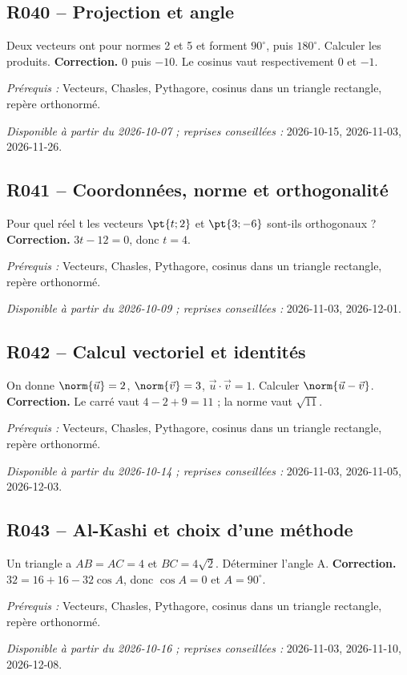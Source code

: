 \subsection*{R040 -- Projection et angle}\label{R040}
Deux vecteurs ont pour normes 2 et 5 et forment $90^\circ$, puis $180^\circ$. Calculer les produits.
\ifmxteacher\textbf{Correction.} $0$ puis $-10$. Le cosinus vaut respectivement 0 et $-1$.\par\textit{Prérequis :} Vecteurs, Chasles, Pythagore, cosinus dans un triangle rectangle, repère orthonormé.\par\textit{Disponible à partir du 2026-10-07 ; reprises conseillées :} 2026-10-15, 2026-11-03, 2026-11-26.\fi
{}\subsection*{R041 -- Coordonnées, norme et orthogonalité}\label{R041}
Pour quel réel t les vecteurs $\pt{t;2}$ et $\pt{3;-6}$ sont-ils orthogonaux ?
\ifmxteacher\textbf{Correction.} $3t-12=0$, donc $t=4$.\par\textit{Prérequis :} Vecteurs, Chasles, Pythagore, cosinus dans un triangle rectangle, repère orthonormé.\par\textit{Disponible à partir du 2026-10-09 ; reprises conseillées :} 2026-11-03, 2026-12-01.\fi
{}\subsection*{R042 -- Calcul vectoriel et identités}\label{R042}
On donne $\norm{\vec u}=2$, $\norm{\vec v}=3$, $\vec u\cdot\vec v=1$. Calculer $\norm{\vec u-\vec v}$.
\ifmxteacher\textbf{Correction.} Le carré vaut $4-2+9=11$ ; la norme vaut $\sqrt{11}$.\par\textit{Prérequis :} Vecteurs, Chasles, Pythagore, cosinus dans un triangle rectangle, repère orthonormé.\par\textit{Disponible à partir du 2026-10-14 ; reprises conseillées :} 2026-11-03, 2026-11-05, 2026-12-03.\fi
{}\subsection*{R043 -- Al-Kashi et choix d’une méthode}\label{R043}
Un triangle a $AB=AC=4$ et $BC=4\sqrt2$. Déterminer l’angle A.
\ifmxteacher\textbf{Correction.} $32=16+16-32\cos A$, donc $\cos A=0$ et $A=90^\circ$.\par\textit{Prérequis :} Vecteurs, Chasles, Pythagore, cosinus dans un triangle rectangle, repère orthonormé.\par\textit{Disponible à partir du 2026-10-16 ; reprises conseillées :} 2026-11-03, 2026-11-10, 2026-12-08.\fi
